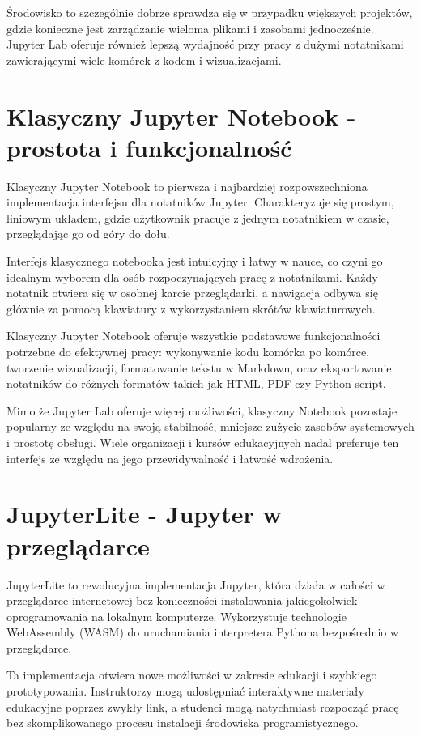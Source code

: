\documentclass[
  polish,
  letterpaper,
  DIV=11,
  numbers=noendperiod]{scrreprt}
\begin{document}
Środowisko to szczególnie dobrze sprawdza się w przypadku większych
projektów, gdzie konieczne jest zarządzanie wieloma plikami i zasobami
jednocześnie. Jupyter Lab oferuje również lepszą wydajność przy pracy z
dużymi notatnikami zawierającymi wiele komórek z kodem i wizualizacjami.

\section{Klasyczny Jupyter Notebook - prostota i
funkcjonalność}\label{klasyczny-jupyter-notebook---prostota-i-funkcjonalnoux15bux107}

Klasyczny Jupyter Notebook to pierwsza i najbardziej rozpowszechniona
implementacja interfejsu dla notatników Jupyter. Charakteryzuje się
prostym, liniowym układem, gdzie użytkownik pracuje z jednym notatnikiem
w czasie, przeglądając go od góry do dołu.

Interfejs klasycznego notebooka jest intuicyjny i łatwy w nauce, co
czyni go idealnym wyborem dla osób rozpoczynających pracę z notatnikami.
Każdy notatnik otwiera się w osobnej karcie przeglądarki, a nawigacja
odbywa się głównie za pomocą klawiatury z wykorzystaniem skrótów
klawiaturowych.

Klasyczny Jupyter Notebook oferuje wszystkie podstawowe funkcjonalności
potrzebne do efektywnej pracy: wykonywanie kodu komórka po komórce,
tworzenie wizualizacji, formatowanie tekstu w Markdown, oraz
eksportowanie notatników do różnych formatów takich jak HTML, PDF czy
Python script.

Mimo że Jupyter Lab oferuje więcej możliwości, klasyczny Notebook
pozostaje popularny ze względu na swoją stabilność, mniejsze zużycie
zasobów systemowych i prostotę obsługi. Wiele organizacji i kursów
edukacyjnych nadal preferuje ten interfejs ze względu na jego
przewidywalność i łatwość wdrożenia.

\section{JupyterLite - Jupyter w
przeglądarce}\label{jupyterlite---jupyter-w-przeglux105darce}

JupyterLite to rewolucyjna implementacja Jupyter, która działa w całości
w przeglądarce internetowej bez konieczności instalowania jakiegokolwiek
oprogramowania na lokalnym komputerze. Wykorzystuje technologie
WebAssembly (WASM) do uruchamiania interpretera Pythona bezpośrednio w
przeglądarce.

Ta implementacja otwiera nowe możliwości w zakresie edukacji i szybkiego
prototypowania. Instruktorzy mogą udostępniać interaktywne materiały
edukacyjne poprzez zwykły link, a studenci mogą natychmiast rozpocząć
pracę bez skomplikowanego procesu instalacji środowiska
programistycznego.
\end{document}
